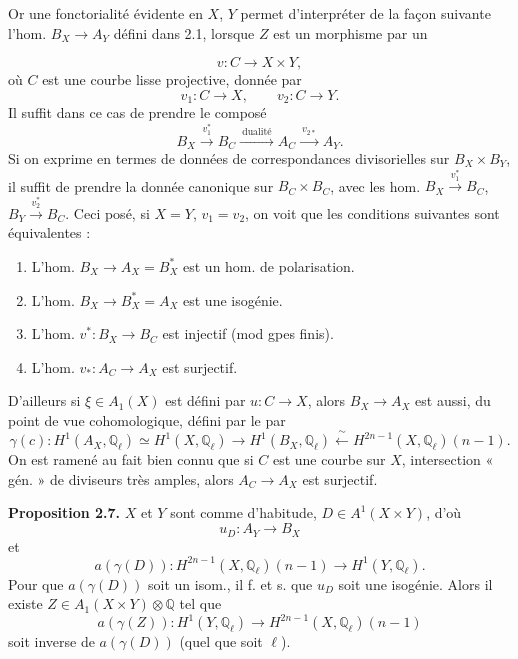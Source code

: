 \documentclass[11pt,a4paper]{article}
\begin{document}
Or une fonctorialité évidente en $X$, $Y$ permet d'interpréter de la façon suivante l'hom.
$B_{X} \to A_{Y}$ défini dans 2.1, lorsque $Z$ est un morphisme
 par un

\[
  v : C \longrightarrow X \times Y ,
\]
où $C$ est une courbe lisse projective, donnée par
\[
  v_{1} : C \longrightarrow X , \qquad v_{2} : C \longrightarrow Y .
\]
Il suffit dans ce cas de prendre le composé
\[
  B_{X} \xrightarrow{\ v_{1}^{*}\ } B_{C} \xrightarrow{\ \text{dualité}\ } A_{C}
  \xrightarrow{\ v_{2*}\ } A_{Y} .
\]
Si on exprime en termes de données de correspondances divisorielles sur $B_{X} \times B_{Y}$, il
suffit de prendre la donnée  canonique sur $B_{C} \times B_{C}$,
avec les hom. $B_{X} \xrightarrow{v_{1}^{*}} B_{C}$, $B_{Y} \xrightarrow{v_{2}^{*}} B_{C}$.
Ceci posé, si $X = Y$, $v_{1} = v_{2}$, on voit que  les conditions
suivantes sont équivalentes :
\begin{enumerate}
  \item[(i)] L'hom. $B_{X} \to A_{X} = B_{X}^{*}$ est un hom. de polarisation.
  \item[(ii)] L'hom. $B_{X} \to B_{X}^{*} = A_{X}$ est une isogénie.
  \item[(iii)] L'hom. $v^{*} : B_{X} \to B_{C}$ est injectif (mod gpes finis).
  \item[(iv)] L'hom. $v_{*} : A_{C} \to A_{X}$ est surjectif.
\end{enumerate}

D'ailleurs si $\xi \in A_{1}(X)$ est défini par $u : C \to X$, alors $B_{X} \to A_{X}$ est aussi,
du point de vue cohomologique, défini par le  par
\[
  \gamma(c) : H^{1}(A_{X}, \mathbb{Q}_{\ell}) \simeq H^{1}(X, \mathbb{Q}_{\ell})
  \longrightarrow H^{1}(B_{X}, \mathbb{Q}_{\ell}) \xleftarrow{\ \sim\ }
  H^{2n-1}(X, \mathbb{Q}_{\ell})(n-1) .
\]
On est ramené au fait bien connu que si $C$ est une courbe sur $X$, intersection « gén. » de
diviseurs très amples, alors $A_{C} \to A_{X}$ est surjectif.

\textbf{Proposition 2.7.} $X$ et $Y$ sont comme d'habitude, $D \in A^{1}(X \times Y)$, d'où
\[
  u_{D} : A_{Y} \longrightarrow B_{X}
\]
et
\[
  a(\gamma(D)) : H^{2n-1}(X, \mathbb{Q}_{\ell})(n-1) \longrightarrow H^{1}(Y, \mathbb{Q}_{\ell}) .
\]
Pour que $a(\gamma(D))$ soit un isom., il f. et s. que $u_{D}$ soit une isogénie. Alors il existe
$Z \in A_{1}(X \times Y) \otimes \mathbb{Q}$ tel que
\[
  a(\gamma(Z)) : H^{1}(Y, \mathbb{Q}_{\ell}) \longrightarrow
  H^{2n-1}(X, \mathbb{Q}_{\ell})(n-1)
\]
soit  inverse de $a(\gamma(D))$ (quel que soit $\ell$). 
\end{document}

